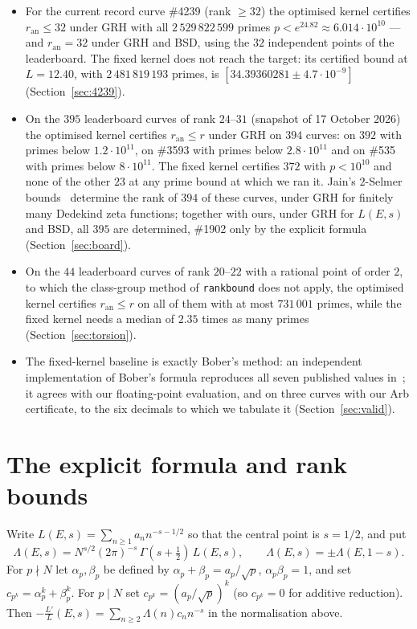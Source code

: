 \documentclass[11pt]{amsart}
\theoremstyle{remark}
\theoremstyle{definition}
\newcommand{\ran}{r_{\mathrm{an}}}
\begin{document}
\begin{itemize}
\item For the current record curve \#4239 (rank $\ge32$) the optimised kernel certifies $\ran\le32$ under GRH with all $2\,529\,822\,599$ primes $p<e^{24.82}\approx6.014\cdot10^{10}$ --- and $\ran=32$ under GRH and BSD, using the $32$ independent points of the leaderboard. The fixed kernel does not reach the target: its certified bound at $L=12.40$, with
$2\,481\,819\,193$ primes, is $[34.39360281\pm4.7\cdot10^{-9}]$ (Section~\ref{sec:4239}).
\item On the $395$ leaderboard curves of rank $24$--$31$ (snapshot of 17 October 2026) the optimised kernel certifies $\ran\le r$ under GRH on $394$ curves: on $392$ with primes below $1.2\cdot10^{11}$, on \#3593 with primes below $2.8\cdot10^{11}$ and on \#535 with primes below $8\cdot10^{11}$. The fixed kernel certifies $372$ with $p<10^{10}$ and none of the other $23$ at any prime bound at which we ran it. Jain's $2$-Selmer bounds~\cite{Jain} determine the rank of $394$ of these curves, under GRH for finitely many Dedekind zeta functions; together with ours, under GRH for $L(E,s)$ and BSD, all $395$ are determined, \#1902 only by the explicit formula (Section~\ref{sec:board}).
\item On the $44$ leaderboard curves of rank $20$--$22$ with a rational point of order $2$, to which the class-group method of \texttt{rankbound} does not apply, the optimised kernel certifies $\ran\le r$ on all of them with at most $731\,001$ primes, while the fixed kernel needs a median of $2.35$ times as many primes (Section~\ref{sec:torsion}).
\item The fixed-kernel baseline is exactly Bober's method: an independent implementation of Bober's formula reproduces all seven published values in~\cite{Bober,KSW}; it agrees with our floating-point evaluation, and on three curves with our Arb certificate, to the six decimals to which we tabulate it (Section~\ref{sec:valid}).
\end{itemize}

\section{The explicit formula and rank bounds}

Write $L(E,s)=\sum_{n\ge1} a_n n^{-s-1/2}$ so that the central point is $s=1/2$, and put
\[
\Lambda(E,s) = N^{s/2}(2\pi)^{-s}\,\Gamma(s+\tfrac12)\,L(E,s), \qquad \Lambda(E,s)=\pm\Lambda(E,1-s).
\]
For $p\nmid N$ let $\alpha_p,\beta_p$ be defined by $\alpha_p+\beta_p=a_p/\sqrt p$, $\alpha_p\beta_p=1$, and set $c_{p^k}=\alpha_p^k+\beta_p^k$. For $p\mid N$ set $c_{p^k}=(a_p/\sqrt p)^k$ (so $c_{p^k}=0$ for additive reduction). Then $-\frac{L'}{L}(E,s)=\sum_{n\ge2}\Lambda(n)c_n n^{-s}$ in the normalisation above.
\end{document}
